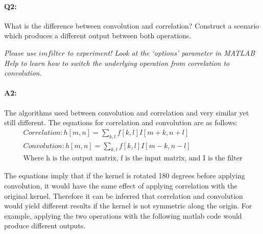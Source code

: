 
	\pagebreak
	\paragraph{Q2:} What is the difference between convolution and correlation? Construct a scenario which produces a different output between both operations.

	\emph{Please use \href{https://www.mathworks.com/help/images/ref/imfilter.html}{$imfilter$} to experiment! Look at the `options' parameter in MATLAB Help to learn how to switch the underlying operation from correlation to convolution.}

	\paragraph{A2:}
    The algorithms used between convolution and correlation and very similar yet still different. The equations for correlation and convolution are as follows:
    \begin{align*}
        Correlation: h[m,n] = \sum_{k,l} f[k,l] I[m+k,n+l] \\
        Convolution: h[m,n] = \sum_{k,l} f[k,l] I[m-k,n-l] \\
        \text{Where h is the output matrix, f is the input matrix, and I is the filter}
    \end{align*}

    The equations imply that if the kernel is rotated 180 degrees before applying convolution, it would have the same effect of applying correlation with the original kernel. Therefore it can be inferred that correlation and convolution would yield different results if the kernel is not symmetric along the origin.
    For example, applying the two operations with the following matlab code would produce different outputs.

